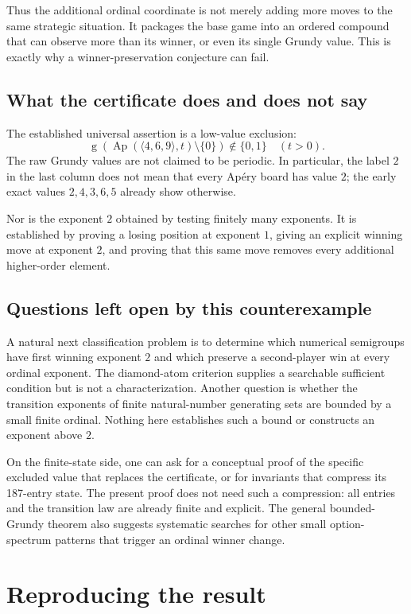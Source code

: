 \documentclass[11pt,letterpaper]{article}
\numberwithin{equation}{section}
\theoremstyle{definition}
\newcommand{\Gr}{\operatorname{g}}
\newcommand{\Ap}{\operatorname{Ap}}
\begin{document}
Thus the additional ordinal coordinate is not merely adding more moves to
the same strategic situation. It packages the base game into an ordered
compound that can observe more than its winner, or even its single Grundy
value. This is exactly why a winner-preservation conjecture can fail.

\subsection{What the certificate does and does not say}

The established universal assertion is a low-value exclusion:
\[
 \Gr(\Ap(\langle4,6,9\rangle,t)\setminus\{0\})\notin\{0,1\}
 \quad(t>0).
\]
The raw Grundy values are not claimed to be periodic. In particular, the
label $2$ in the last column does not mean that every Ap\'ery board has
value $2$; the early exact values $2,4,3,6,5$ already show otherwise.

Nor is the exponent $2$ obtained by testing finitely many exponents.
It is established by proving a losing position at exponent $1$, giving an
explicit winning move at exponent $2$, and proving that this same move
removes every additional higher-order element.

\subsection{Questions left open by this counterexample}

A natural next classification problem is to determine which numerical
semigroups have first winning exponent $2$ and which preserve a second-player
win at every ordinal exponent. The diamond-atom criterion supplies a
searchable sufficient condition but is not a characterization.
Another question is whether the transition exponents of finite
natural-number generating sets are bounded by a small finite ordinal.
Nothing here establishes such a bound or constructs an exponent above $2$.

On the finite-state side, one can ask for a conceptual proof of the
specific excluded value that replaces the certificate, or for invariants
that compress its 187-entry state. The present proof does not need such a
compression: all entries and the transition law are already finite and
explicit. The general bounded-Grundy theorem also suggests systematic
searches for other small option-spectrum patterns that trigger an ordinal
winner change.

\section{Reproducing the result}
\label{sec:reproduce}
\end{document}
